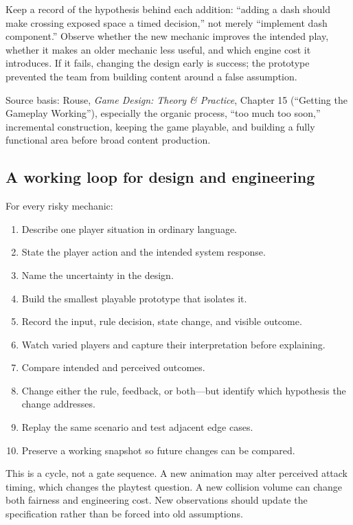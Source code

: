 Keep a record of the hypothesis behind each addition: ``adding a dash should make crossing exposed space a timed decision,'' not merely ``implement dash component.'' Observe whether the new mechanic improves the intended play, whether it makes an older mechanic less useful, and which engine cost it introduces. If it fails, changing the design early is success; the prototype prevented the team from building content around a false assumption.

Source basis: Rouse, \emph{Game Design: Theory \& Practice}, Chapter 15 (``Getting the Gameplay Working''), especially the organic process, ``too much too soon,'' incremental construction, keeping the game playable, and building a fully functional area before broad content production.

\subsection{A working loop for design and engineering}\label{06-engine-ii-ch041-a-working-loop-for-design-and-engineering}

For every risky mechanic:

\begin{enumerate}
\def\labelenumi{\arabic{enumi}.}
\tightlist
\item
  Describe one player situation in ordinary language.
\item
  State the player action and the intended system response.
\item
  Name the uncertainty in the design.
\item
  Build the smallest playable prototype that isolates it.
\item
  Record the input, rule decision, state change, and visible outcome.
\item
  Watch varied players and capture their interpretation before explaining.
\item
  Compare intended and perceived outcomes.
\item
  Change either the rule, feedback, or both---but identify which hypothesis the change addresses.
\item
  Replay the same scenario and test adjacent edge cases.
\item
  Preserve a working snapshot so future changes can be compared.
\end{enumerate}

This is a cycle, not a gate sequence. A new animation may alter perceived attack timing, which changes the playtest question. A new collision volume can change both fairness and engineering cost. New observations should update the specification rather than be forced into old assumptions.

